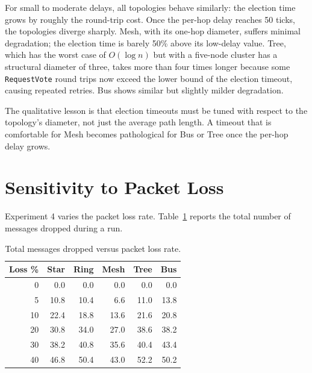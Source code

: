 For small to moderate delays, all topologies behave similarly: the election time grows by roughly the round-trip cost. Once the per-hop delay reaches 50 ticks, the topologies diverge sharply. Mesh, with its one-hop diameter, suffers minimal degradation; the election time is barely 50\% above its low-delay value. Tree, which has the worst case of $O(\log n)$ but with a five-node cluster has a structural diameter of three, takes more than four times longer because some \texttt{RequestVote} round trips now exceed the lower bound of the election timeout, causing repeated retries. Bus shows similar but slightly milder degradation.

The qualitative lesson is that election timeouts must be tuned with respect to the topology's diameter, not just the average path length. A timeout that is comfortable for Mesh becomes pathological for Bus or Tree once the per-hop delay grows.

\section{Sensitivity to Packet Loss}

Experiment 4 varies the packet loss rate. Table~\ref{tab:exp4_dropped} reports the total number of messages dropped during a run.

\begin{table}[H]
\centering
\caption{Total messages dropped versus packet loss rate.}
\label{tab:exp4_dropped}
\begin{tabular}{rrrrrr}
\toprule
\textbf{Loss \%} & \textbf{Star} & \textbf{Ring} & \textbf{Mesh} & \textbf{Tree} & \textbf{Bus} \\
\midrule
0  & 0.0  & 0.0  & 0.0  & 0.0  & 0.0  \\
5  & 10.8 & 10.4 & 6.6  & 11.0 & 13.8 \\
10 & 22.4 & 18.8 & 13.6 & 21.6 & 20.8 \\
20 & 30.8 & 34.0 & 27.0 & 38.6 & 38.2 \\
30 & 38.2 & 40.8 & 35.6 & 40.4 & 43.4 \\
40 & 46.8 & 50.4 & 43.0 & 52.2 & 50.2 \\
\bottomrule
\end{tabular}
\end{table}

